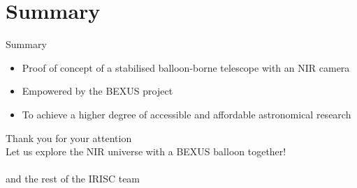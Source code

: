 \documentclass[11pt, aspectratio=169]{beamer}
\begin{document}
\section{Summary}
\begin{frame}[t]{Summary} 		%
\centering
\begin{itemize}
    \item Proof of concept of a stabilised balloon-borne telescope with an NIR camera
    \item Empowered by the BEXUS project
    \item To achieve a higher degree of accessible and affordable astronomical research
\end{itemize}

\begin{figure}
    \vspace{-.3cm}
     \hspace{2cm}
\end{figure}
\end{frame}

\begin{frame}
    \centering
    \Huge Thank you for your attention\\\vspace{.3cm}
    \Large Let us explore the NIR universe with a BEXUS balloon together!\\
    
    \vspace{1cm}
    \large \insertauthor \\\vspace{.2cm}%
    and the rest of the IRISC team
\end{frame}
\end{document}
